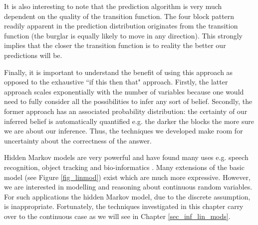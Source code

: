 It is also interesting to note that the prediction algorithm is very much dependent on the quality of the transition function. The four block pattern readily apparent in the prediction distribution originates from the transition function (the burglar is equally likely to move in any direction). This strongly implies that the closer the transition function is to reality the better our predictions will be.

Finally, it is important to understand the benefit of using this approach as opposed to the exhaustive ``if this then that" approach. Firstly, the latter approach scales exponentially with the number of variables because one would need to fully consider all the possibilities to infer any sort of belief. Secondly, the former approach has an associated probability distribution: the certainty of our inferred belief is automatically quantified e.g. the darker the blocks the more sure we are about our inference. Thus, the techniques we developed make room for uncertainty about the correctness of the answer.

Hidden Markov models are very powerful and have found many uses e.g. speech recognition, object tracking and bio-informatics \cite{barber}. Many extensions of the basic model (see Figure \ref{fig_linmod}) exist which are much more expressive. However, we are interested in modelling and reasoning about continuous random variables. For such applications the hidden Markov model, due to the discrete assumption, is inappropriate. Fortunately, the techniques investigated in this chapter carry over to the continuous case as we will see in Chapter \ref{sec_inf_lin_mods}.  
